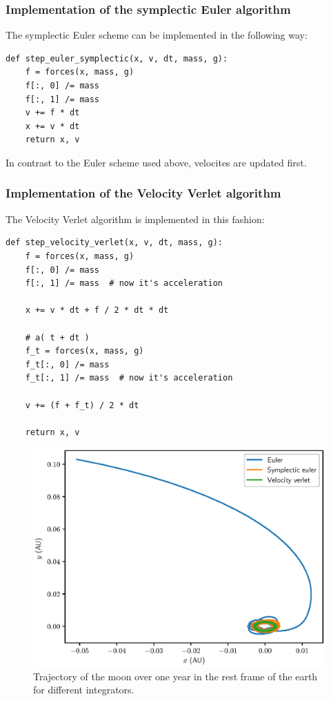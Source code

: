 \documentclass[a4paper,10pt,bibtotoc]{scrartcl}
\begin{document}
\subsubsection{Implementation of the symplectic Euler algorithm}
The symplectic Euler scheme can be implemented in the following way:
\begin{lstlisting}
def step_euler_symplectic(x, v, dt, mass, g):
    f = forces(x, mass, g)
    f[:, 0] /= mass
    f[:, 1] /= mass
    v += f * dt
    x += v * dt
    return x, v 
\end{lstlisting}
In contrast to the Euler scheme used above, velocites are updated first.

\subsubsection{Implementation of the Velocity Verlet algorithm}
The Velocity Verlet algorithm is implemented in this fashion:
\begin{lstlisting}
def step_velocity_verlet(x, v, dt, mass, g):
    f = forces(x, mass, g)
    f[:, 0] /= mass
    f[:, 1] /= mass  # now it's acceleration

    x += v * dt + f / 2 * dt * dt

    # a( t + dt )
    f_t = forces(x, mass, g)
    f_t[:, 0] /= mass
    f_t[:, 1] /= mass  # now it's acceleration

    v += (f + f_t) / 2 * dt

    return x, v
\end{lstlisting}

\begin{figure}[h]
\centering
 \includegraphics[width=\textwidth]{stability_position.eps}
 \caption{Trajectory of the moon over one year in the rest frame of the earth for different integrators.}
 \label{fig:stability_position}
\end{figure}
\end{document}

